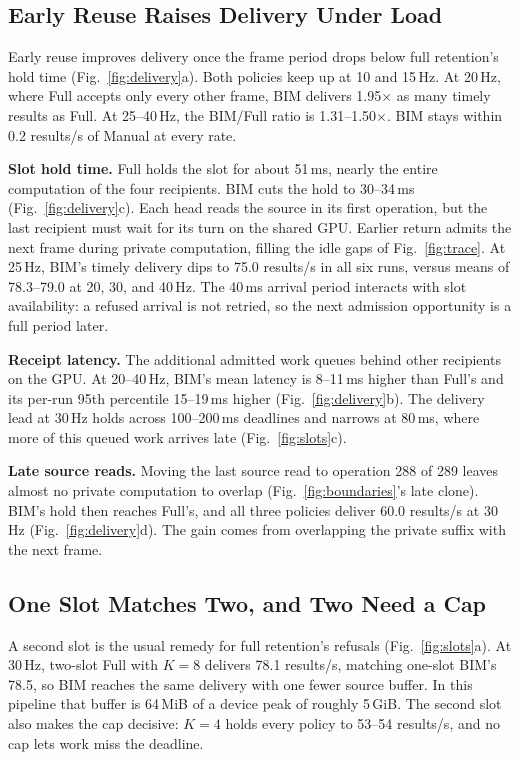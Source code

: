 \documentclass[conference]{IEEEtran}
\newcommand{\MiB}{\,MiB}
\newcommand{\ms}{\,ms}
\newcommand{\Hz}{\,Hz}
\begin{document}
\subsection{Early Reuse Raises Delivery Under Load}
\label{sec:eval-delivery}

Early reuse improves delivery once the frame period drops below full retention's hold time (Fig.~\ref{fig:delivery}a). Both policies keep up at 10 and 15\Hz. At 20\Hz, where Full accepts only every other frame, BIM delivers 1.95$\times$ as many timely results as Full. At 25--40\Hz, the BIM/Full ratio is 1.31--1.50$\times$. BIM stays within 0.2 results/s of Manual at every rate.

\textbf{Slot hold time.} Full holds the slot for about 51\ms, nearly the entire computation of the four recipients. BIM cuts the hold to 30--34\ms{} (Fig.~\ref{fig:delivery}c). Each head reads the source in its first operation, but the last recipient must wait for its turn on the shared GPU. Earlier return admits the next frame during private computation, filling the idle gaps of Fig.~\ref{fig:trace}. At 25\Hz, BIM's timely delivery dips to 75.0 results/s in all six runs, versus means of 78.3--79.0 at 20, 30, and 40\Hz. The 40\ms{} arrival period interacts with slot availability: a refused arrival is not retried, so the next admission opportunity is a full period later.

\textbf{Receipt latency.} The additional admitted work queues behind other recipients on the GPU. At 20--40\Hz, BIM's mean latency is 8--11\ms{} higher than Full's and its per-run 95th percentile 15--19\ms{} higher (Fig.~\ref{fig:delivery}b). The delivery lead at 30\Hz{} holds across 100--200\ms{} deadlines and narrows at 80\ms, where more of this queued work arrives late (Fig.~\ref{fig:slots}c).

\textbf{Late source reads.}\label{sec:eval-late} Moving the last source read to operation 288 of 289 leaves almost no private computation to overlap (Fig.~\ref{fig:boundaries}'s late clone). BIM's hold then reaches Full's, and all three policies deliver 60.0 results/s at 30\Hz{} (Fig.~\ref{fig:delivery}d). The gain comes from overlapping the private suffix with the next frame.

\subsection{One Slot Matches Two, and Two Need a Cap}
\label{sec:eval-slots}

A second slot is the usual remedy for full retention's refusals (Fig.~\ref{fig:slots}a). At 30\Hz, two-slot Full with $K{=}8$ delivers 78.1 results/s, matching one-slot BIM's 78.5, so BIM reaches the same delivery with one fewer source buffer. In this pipeline that buffer is 64\MiB{} of a device peak of roughly 5\,GiB. The second slot also makes the cap decisive: $K{=}4$ holds every policy to 53--54 results/s, and no cap lets work miss the deadline.
\end{document}
